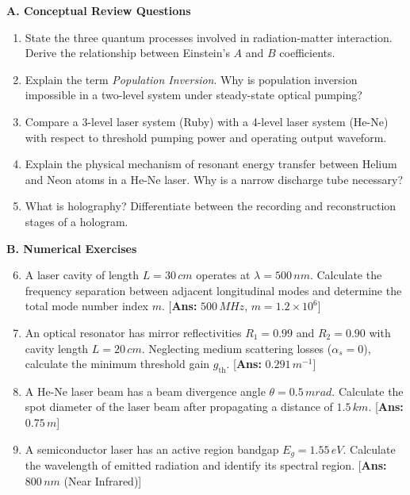 \begin{practiceset}
\textbf{A. Conceptual Review Questions}
\begin{enumerate}
    \item State the three quantum processes involved in radiation-matter interaction. Derive the relationship between Einstein's $A$ and $B$ coefficients.
    \item Explain the term \textit{Population Inversion}. Why is population inversion impossible in a two-level system under steady-state optical pumping?
    \item Compare a 3-level laser system (Ruby) with a 4-level laser system (He-Ne) with respect to threshold pumping power and operating output waveform.
    \item Explain the physical mechanism of resonant energy transfer between Helium and Neon atoms in a He-Ne laser. Why is a narrow discharge tube necessary?
    \item What is holography? Differentiate between the recording and reconstruction stages of a hologram.
\end{enumerate}

\textbf{B. Numerical Exercises}
\begin{enumerate}
    \setcounter{enumi}{5}
    \item A laser cavity of length $L = 30\,\si{cm}$ operates at $\lambda = 500\,\si{nm}$. Calculate the frequency separation between adjacent longitudinal modes and determine the total mode number index $m$. \hfill [\textbf{Ans:} $500\,\si{MHz}$, $m = 1.2 \times 10^6$]
    \item An optical resonator has mirror reflectivities $R_1 = 0.99$ and $R_2 = 0.90$ with cavity length $L = 20\,\si{cm}$. Neglecting medium scattering losses ($\alpha_s = 0$), calculate the minimum threshold gain $g_{\text{th}}$. \hfill [\textbf{Ans:} $0.291\,\si{m^{-1}}$]
    \item A He-Ne laser beam has a beam divergence angle $\theta = 0.5\,\si{mrad}$. Calculate the spot diameter of the laser beam after propagating a distance of $1.5\,\si{km}$. \hfill [\textbf{Ans:} $0.75\,\si{m}$]
    \item A semiconductor laser has an active region bandgap $E_g = 1.55\,\si{eV}$. Calculate the wavelength of emitted radiation and identify its spectral region. \hfill [\textbf{Ans:} $800\,\si{nm}$ (Near Infrared)]
\end{enumerate}
\end{practiceset}


